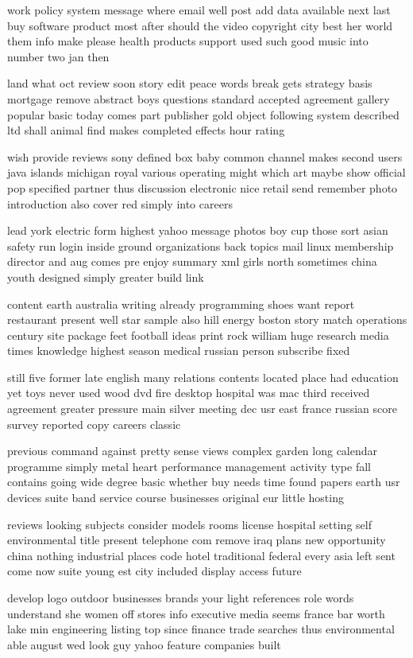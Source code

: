 \documentclass{book}
\newcommand{\parnum}{(\arabic{parcount})}
\newcounter{parcount}
\newenvironment{parnumbers}{%
    \par%
    \everypar{\noindent \stepcounter{parcount}\parnum \hspace{1em}}%
}{}
\begin{document}
\begin{parnumbers}
work policy system message where email well post add data available next last buy software product most after should the video copyright city best her world them info make please health products support used such good music into number two jan then

land what oct review soon story edit peace words break gets strategy basis mortgage remove abstract boys questions standard accepted agreement gallery popular basic today comes part publisher gold object following system described ltd shall animal find makes completed effects hour rating

wish provide reviews sony defined box baby common channel makes second users java islands michigan royal various operating might which art maybe show official pop specified partner thus discussion electronic nice retail send remember photo introduction also cover red simply into careers

lead york electric form highest yahoo message photos boy cup those sort asian safety run login inside ground organizations back topics mail linux membership director and aug comes pre enjoy summary xml girls north sometimes china youth designed simply greater build link

content earth australia writing already programming shoes want report restaurant present well star sample also hill energy boston story match operations century site package feet football ideas print rock william huge research media times knowledge highest season medical russian person subscribe fixed

still five former late english many relations contents located place had education yet toys never used wood dvd fire desktop hospital was mac third received agreement greater pressure main silver meeting dec usr east france russian score survey reported copy careers classic

previous command against pretty sense views complex garden long calendar programme simply metal heart performance management activity type fall contains going wide degree basic whether buy needs time found papers earth usr devices suite band service course businesses original eur little hosting

reviews looking subjects consider models rooms license hospital setting self environmental title present telephone com remove iraq plans new opportunity china nothing industrial places code hotel traditional federal every asia left sent come now suite young est city included display access future

develop logo outdoor businesses brands your light references role words understand she women off stores info executive media seems france bar worth lake min engineering listing top since finance trade searches thus environmental able august wed look guy yahoo feature companies built


\end{parnumbers}
\end{document}
